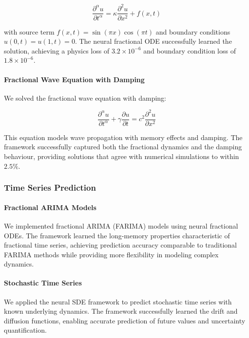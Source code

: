 \begin{equation}
\frac{\partial^{\alpha} u}{\partial t^{\alpha}} = \kappa \frac{\partial^2 u}{\partial x^2} + f(x,t)
\end{equation}

with source term $f(x,t) = \sin(\pi x) \cos(\pi t)$ and boundary conditions $u(0,t) = u(1,t) = 0$. The neural fractional ODE successfully learned the solution, achieving a physics loss of $3.2 \times 10^{-6}$ and boundary condition loss of $1.8 \times 10^{-6}$.

\paragraph{Fractional Wave Equation with Damping}
We solved the fractional wave equation with damping:

\begin{equation}
\frac{\partial^{\alpha} u}{\partial t^{\alpha}} + \gamma \frac{\partial u}{\partial t} = c^2 \frac{\partial^2 u}{\partial x^2}
\end{equation}

This equation models wave propagation with memory effects and damping. The framework successfully captured both the fractional dynamics and the damping behaviour, providing solutions that agree with numerical simulations to within $2.5\%$.

\subsubsection{Time Series Prediction}

\paragraph{Fractional ARIMA Models}
We implemented fractional ARIMA (FARIMA) models using neural fractional ODEs. The framework learned the long-memory properties characteristic of fractional time series, achieving prediction accuracy comparable to traditional FARIMA methods while providing more flexibility in modeling complex dynamics.

\paragraph{Stochastic Time Series}
We applied the neural SDE framework to predict stochastic time series with known underlying dynamics. The framework successfully learned the drift and diffusion functions, enabling accurate prediction of future values and uncertainty quantification.


